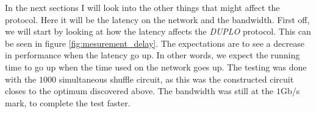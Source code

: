 \documentclass[twoside,11pt,openright]{report}
\newcommand{\DUPLO}{\textit{DUPLO} }
\begin{document}
\bigskip

In the next sections I will look into the other things that might affect the protocol. Here it will be the latency on the network and the bandwidth. First off, we will start by looking at how the latency affects the \DUPLO protocol. This can be seen in figure \ref{fig:mesurement_delay}. The expectations are to see a decrease in performance when the latency go up. In other words, we expect the running time to go up when the time used on the network goes up. The testing was done with the $1000$ simultaneous shuffle circuit, as this was the constructed circuit closes to the optimum discovered above. The bandwidth was still at the $1$Gb/s mark, to complete the test faster.

\bigskip

\begin{figure}
    \centering

    \begin{subfigure}{\textwidth}
        \centering
        \caption{}
        \label{fig:const_delay_plot}
    \end{subfigure}

    \vspace*{0cm}

    \begin{subfigure}{\textwidth}
        \centering
        \caption{}
        \label{fig:eval_delay_plot}
    \end{subfigure}


\end{figure}
\end{document}
